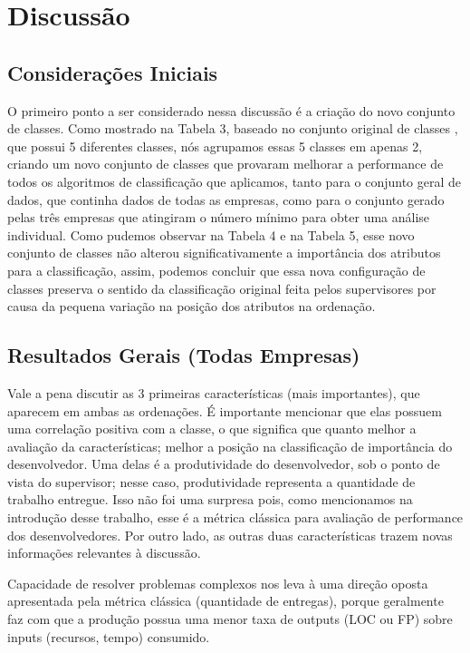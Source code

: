 \chapter[Discussão]{Discussão}

\section{Considerações Iniciais}
O primeiro ponto a ser considerado nessa discussão é a criação do novo conjunto de classes. Como mostrado na Tabela 3, baseado no conjunto original de classes , que possui 5 diferentes classes, nós agrupamos essas 5 classes em apenas 2, criando um novo conjunto de classes que provaram melhorar a performance de todos os algoritmos de classificação que aplicamos, tanto para o conjunto geral de dados, que continha dados de todas as empresas, como para o conjunto gerado pelas três empresas que atingiram o número mínimo para obter uma análise individual. Como pudemos observar na Tabela 4 e na Tabela 5, esse novo conjunto de classes não alterou significativamente a importância dos atributos para a classificação, assim, podemos concluir que essa nova configuração de classes preserva o sentido da classificação original feita pelos supervisores por causa da pequena variação na posição dos atributos na ordenação.
\section{Resultados Gerais (Todas Empresas)}
Vale a pena discutir as 3 primeiras características (mais importantes), que aparecem em ambas as ordenações. É importante mencionar que elas possuem uma correlação positiva com a classe, o que significa que quanto melhor a avaliação da características; melhor a posição na classificação de importância do desenvolvedor. Uma delas é a produtividade do desenvolvedor, sob o ponto de vista do supervisor; nesse caso, produtividade representa a quantidade de trabalho entregue. Isso não foi uma surpresa pois, como mencionamos na introdução desse trabalho, esse é a métrica clássica para avaliação de performance dos desenvolvedores. Por outro lado, as outras duas características trazem novas informações relevantes à discussão.

Capacidade de resolver problemas complexos nos leva à uma direção oposta apresentada pela métrica clássica (quantidade de entregas), porque geralmente faz com que a produção possua uma menor taxa de outputs (LOC ou FP) sobre inputs (recursos, tempo) consumido.

